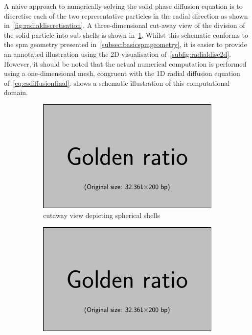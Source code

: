 A  naive approach  to numerically  solving  the solid  phase diffusion  equation
is  to  discretise each  of  the  two  representative  particles in  the  radial
direction  as  shown   in~\cref{fig:radialdiscretisation}.  A  three-dimensional
cut-away view  of the division  of the solid  particle into sub-shells  is shown
in~\cref{subfig:radialdisc3d}. Whilst  this schematic conforms to  the \gls{spm}
geometry presented in~\cref{subsec:basicspmgeometry}, it is easier to provide an
annotated illustration using the 2D visualisation of~\cref{subfig:radialdisc2d}.
However, it should  be noted that the actual numerical  computation is performed
using a  one-dimensional mesh, congruent  with the 1D radial  diffusion equation
of~\cref{eq:csdiffusionfinal}.     shows  a  schematic
illustration of this computational domain.
\begin{figure}[h]
    \centering
    \begin{subfigure}[b]{0.3\textwidth}
        \centering
        \includegraphics[width=\textwidth]{placeholder_images/example-image-golden.pdf}
        \caption{cutaway view depicting spherical shells}
        \label{subfig:radialdisc3d}
    \end{subfigure}
    \hfill
    \begin{subfigure}[b]{0.3\textwidth}
        \centering
        \includegraphics[width=\textwidth]{placeholder_images/example-image-golden.pdf}

\end{subfigure}
\end{figure}
